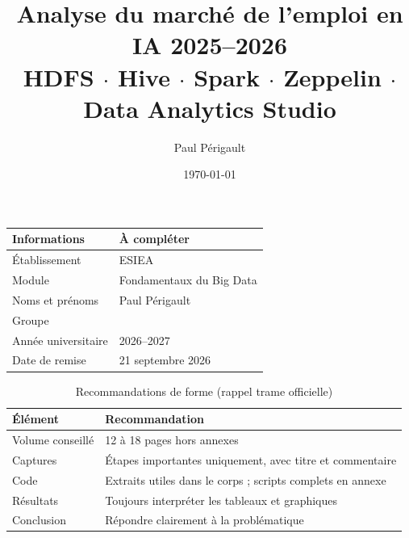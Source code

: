 \documentclass[11pt,a4paper]{article}
\title{Analyse du marché de l'emploi en IA 2025--2026 \\
  \large HDFS $\cdot$ Hive $\cdot$ Spark $\cdot$ Zeppelin $\cdot$ Data Analytics Studio}
\author{Paul Périgault}
\date{\today}
\begin{document}
\maketitle

\begin{table}[H]
\centering
\begin{tabular}{ll}
\toprule
Informations & À compléter \\
\midrule
Établissement & ESIEA \\
Module & Fondamentaux du Big Data \\
Noms et prénoms & Paul Périgault \\
Groupe & \\
Année universitaire & 2026--2027 \\
Date de remise & 21 septembre 2026 \\
\bottomrule
\end{tabular}
\end{table}

\begin{table}[H]
\centering
\caption{Recommandations de forme (rappel trame officielle)}
\begin{tabular}{ll}
\toprule
Élément & Recommandation \\
\midrule
Volume conseillé & 12 à 18 pages hors annexes \\
Captures & Étapes importantes uniquement, avec titre et commentaire \\
Code & Extraits utiles dans le corps ; scripts complets en annexe \\
Résultats & Toujours interpréter les tableaux et graphiques \\
Conclusion & Répondre clairement à la problématique \\
\bottomrule
\end{tabular}
\end{table}

\tableofcontents
\newpage


















\end{document}
